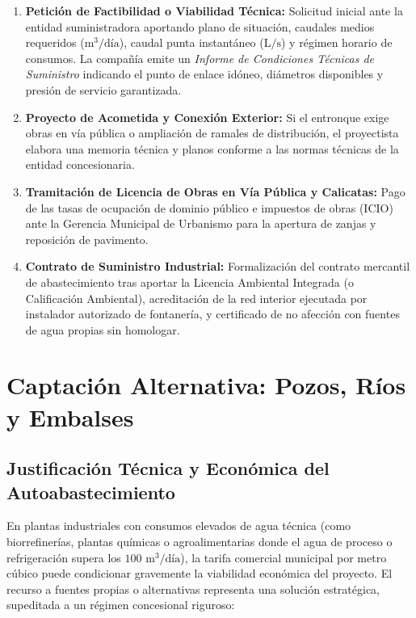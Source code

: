 \documentclass{report}
\begin{document}
\begin{enumerate}

    \item \textbf{Petición de Factibilidad o Viabilidad Técnica:} Solicitud inicial ante la entidad suministradora aportando plano de situación, caudales medios requeridos ($\text{m}^3/\text{día}$), caudal punta instantáneo ($\text{L/s}$) y régimen horario de consumos. La compañía emite un \textit{Informe de Condiciones Técnicas de Suministro} indicando el punto de enlace idóneo, diámetros disponibles y presión de servicio garantizada.

    \item \textbf{Proyecto de Acometida y Conexión Exterior:} Si el entronque exige obras en vía pública o ampliación de ramales de distribución, el proyectista elabora una memoria técnica y planos conforme a las normas técnicas de la entidad concesionaria.

    \item \textbf{Tramitación de Licencia de Obras en Vía Pública y Calicatas:} Pago de las tasas de ocupación de dominio público e impuestos de obras (ICIO) ante la Gerencia Municipal de Urbanismo para la apertura de zanjas y reposición de pavimento.

    \item \textbf{Contrato de Suministro Industrial:} Formalización del contrato mercantil de abastecimiento tras aportar la Licencia Ambiental Integrada (o Calificación Ambiental), acreditación de la red interior ejecutada por instalador autorizado de fontanería, y certificado de no afección con fuentes de agua propias sin homologar.

\end{enumerate}




\chapter{Captación Alternativa: Pozos, Ríos y Embalses}



\section{Justificación Técnica y Económica del Autoabastecimiento}

En plantas industriales con consumos elevados de agua técnica (como biorrefinerías, plantas químicas o agroalimentarias donde el agua de proceso o refrigeración supera los $100\text{ m}^3/\text{día}$), la tarifa comercial municipal por metro cúbico puede condicionar gravemente la viabilidad económica del proyecto. El recurso a fuentes propias o alternativas representa una solución estratégica, supeditada a un régimen concesional riguroso:
\end{document}
